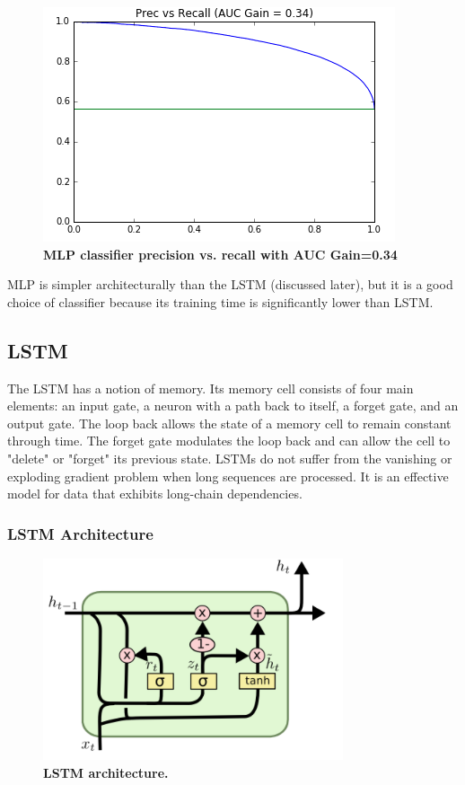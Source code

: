 \documentclass{sig-alternate-05-2015}
\begin{document}
	
	\begin{figure}[H]
		\centering\includegraphics[scale=0.55]{prrc_nn} 
		\caption{\textbf{MLP classifier precision vs. recall with AUC Gain=0.34 }}
	\end{figure}
	
	MLP is simpler architecturally than the LSTM (discussed later), but it is a good choice of classifier because its training time is significantly lower than LSTM.
		

	
	
	\subsection{LSTM}
	The LSTM has a notion of memory. Its memory cell consists of four main elements: an input gate, a neuron with a path back to itself, a forget gate, and an output gate. The loop back allows the state of a memory cell to remain constant through time. The forget gate modulates the loop back and can allow the cell to "delete" or "forget" its previous state. LSTMs do not suffer from the vanishing or exploding gradient problem when long sequences are processed. It is an effective model for data that exhibits long-chain dependencies.  
	\subsubsection{LSTM Architecture}
	\begin{figure}[H]
		\centering\includegraphics[scale=0.5]{lstm_image} 
		\caption{\textbf{ LSTM architecture.}}
	\end{figure}
	
\end{document}
